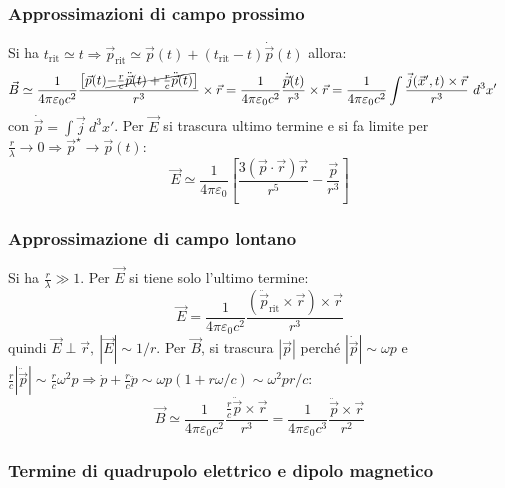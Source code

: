 \documentclass[10pt, a4paper]{scrartcl}
\numberwithin{equation}{subsection}
\theoremstyle{style1}
\begin{document}
\subsubsection{Approssimazioni di campo prossimo}
Si ha $t_\text{rit}\simeq t\Rightarrow \vec{p}_\text{rit}\simeq \vec{p}(t) + (t_\text{rit}-t) \dot{\vec{p}}(t) $ allora:
\begin{equation}
	\begin{split}
		&\vec{B} \simeq \frac{1}{4\pi \varepsilon _0 c^2} \frac{\left[ \vec{p}(t) \cancel{- \frac{r}{c}\ddot{\vec{p}}(t) + \frac{r}{c}\ddot{\vec{p}}(t)} \right] }{r^3} \times \vec{r}=\frac{1}{4\pi \varepsilon _0 c^2}\frac{\dot{\vec{p}}(t)}{r^3}\times \vec{r}=\frac{1}{4\pi \varepsilon _0 c^2}\int \frac{\vec{j}(\vec{x}',t) \times \vec{r}}{r^3}\ d^3 x' 
	\end{split}
\end{equation}
con $\dot{\vec{p}} = \int \vec{j}\ d^3 x' $. Per $\vec{E}$ si trascura ultimo termine e si fa limite per $\frac{r}{\lambda }\to 0 \Rightarrow \vec{p}^\star \to \vec{p}(t)$:
\begin{equation}
	\vec{E}\simeq \frac{1}{4\pi \varepsilon _0} \left[ \frac{3 (\vec{p}\cdot \vec{r}) \vec{r}}{r^5} - \frac{\vec{p}}{r^3} \right] 
\end{equation}
\subsubsection{Approssimazione di campo lontano}
Si ha $\frac{r}{\lambda } \gg 1$. Per $\vec{E}$ si tiene solo l'ultimo termine:
\begin{equation}
	\vec{E} = \frac{1}{4\pi \varepsilon _0 c^2} \frac{(\ddot{\vec{p}}_\text{rit} \times \vec{r}) \times \vec{r}}{r^3}
\end{equation}
quindi $\vec{E}\perp \vec{r}, \ |\vec{E} |\sim 1 / r$. Per $\vec{B}$, si trascura $\left\lvert \vec{p} \right\rvert $ perch\'e $| \dot{\vec{p}} |\sim \omega p$ e $\frac{r}{c} | \ddot{\vec{p}} | \sim \frac{r}{c}\omega^2 p\Rightarrow \dot{p}+ \frac{r}{c}\ddot{p}\sim \omega p (1+ r\omega/ c)\sim\omega^2 p  r / c $:
\begin{equation}
	\vec{B}\simeq \frac{1}{4 \pi \varepsilon _0 c^2 } \frac{\frac{r}{c}\ddot{\vec{p}} \times  \vec{r}}{r^3} = \frac{1}{4\pi \varepsilon _0 c^3} \frac{\ddot{\vec{p}}\times \vec{r}}{r^2}
\end{equation}
\subsubsection{Termine di quadrupolo elettrico e dipolo magnetico}
\end{document}
